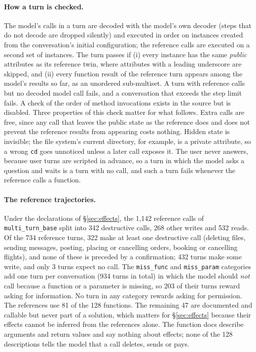 \documentclass{article}
\newcommand{\cls}[1]{\texttt{#1}}
\begin{document}
\paragraph{How a turn is checked.} The model's calls in a turn are decoded with the model's own decoder (steps that do
not decode are dropped silently) and executed in order on instances created from the conversation's initial
configuration; the reference calls are executed on a second set of instances. The turn passes if (i) every instance has
the same \emph{public} attributes as its reference twin, where attributes with a leading underscore are skipped, and (ii)
every function result of the reference turn appears among the model's results so far, as an unordered sub-multiset. A
turn with reference calls but no decoded model call fails, and a conversation that exceeds the step limit fails. A check
of the order of method invocations exists in the source but is disabled. Three properties of this check matter for what
follows. Extra calls are free, since any call that leaves the public state as the reference does and does not prevent
the reference results from appearing costs nothing. Hidden state is invisible; the file system's current directory, for
example, is a private attribute, so a wrong \cls{cd} goes unnoticed unless a later call exposes it. The user never
answers, because user turns are scripted in advance, so a turn in which the model asks a question and waits is a turn
with no call, and such a turn fails whenever the reference calls a function.

\paragraph{The reference trajectories.} Under the declarations of \S\ref{sec:effects}, the 1,142 reference calls of
\cls{multi\_turn\_base} split into 342 destructive calls, 268 other writes and 532 reads. Of the 734 reference turns, 322
make at least one destructive call (deleting files, sending messages, posting, placing or cancelling orders, booking or
cancelling flights), and none of these is preceded by a confirmation; 432 turns make some write, and only 3 turns expect
no call. The \cls{miss\_func} and \cls{miss\_param} categories add one turn per conversation (934 turns in total) in
which the model should \emph{not} call because a function or a parameter is missing, so 203 of their turns reward asking
for information. No turn in any category rewards asking for permission. The references use 81 of the 128 functions. The
remaining 47 are documented and callable but never part of a solution, which matters for \S\ref{sec:effects} because
their effects cannot be inferred from the references alone. The function docs describe arguments and return values and
say nothing about effects; none of the 128 descriptions tells the model that a call deletes, sends or pays.
\end{document}
